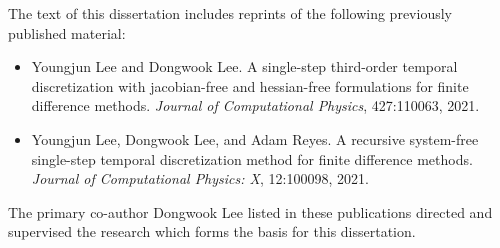 The text of this dissertation includes reprints of the following previously published material:
\begin{itemize}
    \item Youngjun Lee and Dongwook Lee. A single-step third-order temporal discretization with jacobian-free and hessian-free formulations for finite difference methods. \textit{Journal of Computational Physics}, 427:110063, 2021.
    \item Youngjun Lee, Dongwook Lee, and Adam Reyes. A recursive system-free single-step temporal discretization method for finite difference methods. \textit{Journal of Computational Physics: X}, 12:100098, 2021.
\end{itemize}
The primary co-author Dongwook Lee listed in these publications directed and supervised the research which forms the basis for this dissertation.
